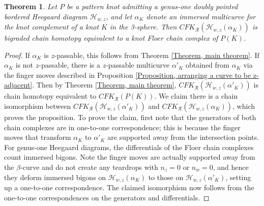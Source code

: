 \documentclass{amsart}
\newtheorem{thm}{Theorem}[section]
\theoremstyle{definition}
\theoremstyle{remark}
\numberwithin{equation}{section}
\numberwithin{equation}{section} \makeatletter
\begin{document}
\begin{thm}\label{Theorem, pairing theorem restricted to genus-one patterns}
	Let $P$ be a pattern knot admitting a genus-one doubly pointed bordered Heegaard diagram $\mathcal{H}_{w,z}$, and let $\alpha_K$ denote an immersed multicurve for the knot complement of a knot $K$ in the 3-sphere. Then $CFK_{\mathcal{R}}(\mathcal{H}_{w,z}(\alpha_K))$ is bigraded chain homotopy equivalent to a knot Floer chain complex of $P(K)$.
\end{thm}
\begin{proof}
	If $\alpha_K$ is $z$-passable, this follows from Theorem \ref{Theorem, main theorem}. If $\alpha_K$ is not $z$-passable, there is a $z$-passable multicurve $\alpha'_K$ obtained from $\alpha_K$ via the finger moves described in Proposition \ref{Proposition, arranging a curve to be z-adjacent}. Then by Theorem \ref{Theorem, main theorem}, $CFK_{\mathcal{R}}(\mathcal{H}_{w,z}(\alpha'_K))$ is chain homotopy equivalent to $CFK_{\mathcal{R}}(P(K))$. We claim there is a chain isomorphism between $CFK_{\mathcal{R}}(\mathcal{H}_{w,z}(\alpha'_K))$ and $CFK_{\mathcal{R}}(\mathcal{H}_{w,z}(\alpha_K))$, which proves the proposition. To prove the claim, first note that the generators of both chain complexes are in one-to-one correspondence; this is because the finger moves that transform $\alpha_K$ to $\alpha'_K$ are supported away from the intersection points. For genus-one Heegaard diagrams, the differentials of the Floer chain complexes count immersed bigons. Note the finger moves are actually supported away from the $\beta$-curve and do not create any teardrops with $n_z=0$ or $n_w=0$, and hence they deform immersed bigons on $\mathcal{H}_{w,z}(\alpha_K)$ to those on $\mathcal{H}_{w,z}(\alpha'_K)$, setting up a one-to-one correspondence. The claimed isomorphism now follows from the one-to-one correspondences on the generators and differentials. \end{proof}
\end{document}
